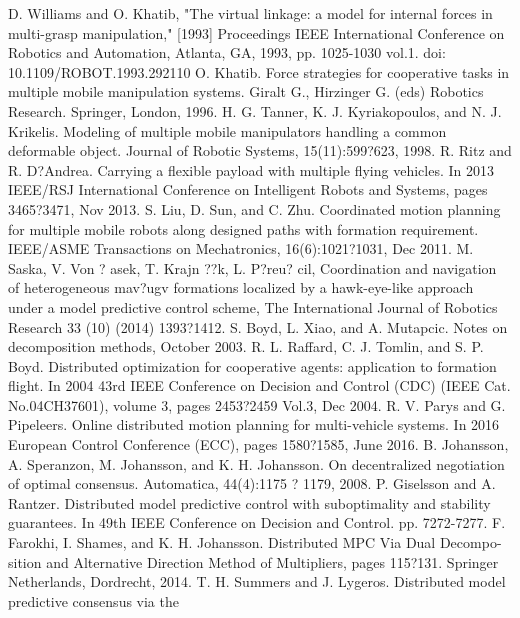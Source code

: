 \documentclass[letterpaper, 10 pt, conference]{ieeeconf}
\begin{document}
\begin{thebibliography}{99}

 D. Williams and O. Khatib, "The virtual linkage: a model for internal forces in multi-grasp manipulation," [1993] Proceedings IEEE International Conference on Robotics and Automation, Atlanta, GA, 1993, pp. 1025-1030 vol.1.
doi: 10.1109/ROBOT.1993.292110
O. Khatib. Force strategies for cooperative tasks in multiple mobile manipulation
systems. Giralt G., Hirzinger G. (eds) Robotics Research. Springer, London, 1996.
H. G. Tanner, K. J. Kyriakopoulos, and N. J. Krikelis. Modeling of multiple mobile
manipulators handling a common deformable object. Journal of Robotic Systems,
15(11):599?623, 1998.
R. Ritz and R. D?Andrea. Carrying a flexible payload with multiple flying vehicles.
In 2013 IEEE/RSJ International Conference on Intelligent Robots and Systems, pages
3465?3471, Nov 2013.
S. Liu, D. Sun, and C. Zhu. Coordinated motion planning for multiple mobile robots
along designed paths with formation requirement. IEEE/ASME Transactions on
Mechatronics, 16(6):1021?1031, Dec 2011.
 M. Saska, V. Von ?
asek, T. Krajn ??k, L. P?reu?
cil, Coordination
and navigation of heterogeneous mav?ugv formations localized
by a hawk-eye-like approach under a model predictive control
scheme, The International Journal of Robotics Research 33 (10)
(2014) 1393?1412.
 S. Boyd, L. Xiao, and A. Mutapcic. Notes on decomposition methods, October 2003.
 R. L. Raffard, C. J. Tomlin, and S. P. Boyd. Distributed optimization for cooperative
agents: application to formation flight. In 2004 43rd IEEE Conference on Decision
and Control (CDC) (IEEE Cat. No.04CH37601), volume 3, pages 2453?2459 Vol.3, Dec
2004.
 R. V. Parys and G. Pipeleers. Online distributed motion planning for multi-vehicle
systems. In 2016 European Control Conference (ECC), pages 1580?1585, June 2016.
 B. Johansson, A. Speranzon, M. Johansson, and K. H. Johansson. On decentralized
negotiation of optimal consensus. Automatica, 44(4):1175 ? 1179, 2008.
 P. Giselsson and A. Rantzer. Distributed model predictive control with suboptimality
and stability guarantees. In 49th IEEE Conference on Decision and Control. pp.
7272-7277.
 F. Farokhi, I. Shames, and K. H. Johansson. Distributed MPC Via Dual Decompo-
sition and Alternative Direction Method of Multipliers, pages 115?131. Springer
Netherlands, Dordrecht, 2014.
 T. H. Summers and J. Lygeros. Distributed model predictive consensus via the

\end{thebibliography}
\end{document}
